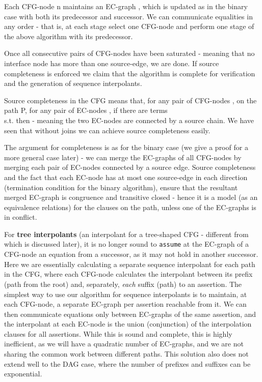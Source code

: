 Each CFG-node n maintains an EC-graph , which is updated as in the binary case with both its predecessor and successor.
We can communicate equalities in any order - that is, at each stage select one CFG-node and perform one stage of the above algorithm with its predecessor.

Once all consecutive pairs of CFG-nodes have been saturated - meaning that no interface node has more than one source-edge, we are done.
If source completeness is enforced we claim that the algorithm is complete for verification and the generation of sequence interpolants.

Source completeness in the CFG means that, for any pair of CFG-nodes , on the path P, for any pair of EC-nodes , if there are terms \\
 s.t.  then  - meaning the two EC-nodes are connected by a source chain. We have seen that without joins we can achieve source completeness easily.

The argument for completeness is as for the binary case (we give a proof for a more general case later) - 
we can merge the EC-graphs of all CFG-nodes by merging each pair of EC-nodes connected by a source edge. Source completeness and the fact that each EC-node has at most one source-edge in each direction (termination condition for the binary algorithm), ensure that the resultant merged EC-graph is congruence and transitive closed - hence it is a model (as an equivalence relations) for the clauses on the path, unless one of the EC-graphs is in conflict.

For \textbf{tree interpolants} (an interpolant for a tree-shaped CFG - different from \cite{BlancGuptaKovacsKragl13} which is discussed later),
it is no longer sound to \lstinline|assume| at the EC-graph of a CFG-node an equation from a successor, as it may not hold in another successor.
Here we are essentially calculating a separate sequence interpolant for each path in the CFG, where each CFG-node calculates the interpolant between its prefix (path from the root) and, separately, \emph{each} suffix (path) to an assertion.
The simplest way to use our algorithm for sequence interpolants is to maintain, at each CFG-node, a separate EC-graph per assertion reachable from it.
We can then communicate equations only between EC-graphs of the same assertion, and the interpolant at each EC-node is the union (conjunction) of the interpolation clauses for all assertions. While this is sound and complete, this is highly inefficient, as we will have a quadratic number of EC-graphs, and we are not sharing the common work between different paths. This solution also does not extend well to the DAG case, where the number of prefixes and suffixes can be exponential.

